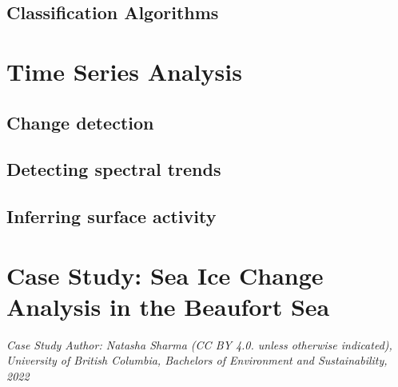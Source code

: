 \documentclass[
]{book}
\begin{document}
\hypertarget{classification-algorithms}{%
\subsection{Classification Algorithms}\label{classification-algorithms}}

\hypertarget{time-series-analysis}{%
\section{Time Series Analysis}\label{time-series-analysis}}

\hypertarget{change-detection}{%
\subsection{Change detection}\label{change-detection}}

\hypertarget{detecting-spectral-trends}{%
\subsection{Detecting spectral trends}\label{detecting-spectral-trends}}

\hypertarget{inferring-surface-activity}{%
\subsection{Inferring surface activity}\label{inferring-surface-activity}}

\hypertarget{case-study-sea-ice-change-analysis-in-the-beaufort-sea}{%
\section{Case Study: Sea Ice Change Analysis in the Beaufort Sea}\label{case-study-sea-ice-change-analysis-in-the-beaufort-sea}}

\emph{Case Study Author: Natasha Sharma (CC BY 4.0. unless otherwise indicated), University of British Columbia, Bachelors of Environment and Sustainability, 2022}
\end{document}
